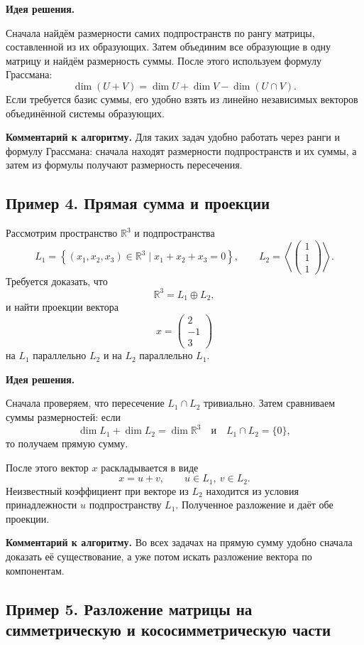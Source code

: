 \textbf{Идея решения.}

Сначала найдём размерности самих подпространств по рангу матрицы, составленной из их образующих. Затем объединим все образующие в одну матрицу и найдём размерность суммы. После этого используем формулу Грассмана:
\[
\dim(U+V)=\dim U+\dim V-\dim(U\cap V).
\]
Если требуется базис суммы, его удобно взять из линейно независимых векторов объединённой системы образующих.

\medskip
\noindent
\textbf{Комментарий к алгоритму.}
Для таких задач удобно работать через ранги и формулу Грассмана: сначала находят размерности подпространств и их суммы, а затем из формулы получают размерность пересечения.

\subsection*{Пример 4. Прямая сумма и проекции}

Рассмотрим пространство $\mathbb R^3$ и подпространства
\[
L_1=\left\{(x_1,x_2,x_3)\in\mathbb R^3 \mid x_1+x_2+x_3=0\right\},
\qquad
L_2=\left\langle
\begin{pmatrix}
1\\1\\1
\end{pmatrix}
\right\rangle.
\]
Требуется доказать, что
\[
\mathbb R^3=L_1\oplus L_2,
\]
и найти проекции вектора
\[
x=
\begin{pmatrix}
2\\-1\\3
\end{pmatrix}
\]
на $L_1$ параллельно $L_2$ и на $L_2$ параллельно $L_1$.

\textbf{Идея решения.}

Сначала проверяем, что пересечение $L_1\cap L_2$ тривиально. Затем сравниваем суммы размерностей: если
\[
\dim L_1+\dim L_2=\dim \mathbb R^3
\quad\text{и}\quad
L_1\cap L_2=\{0\},
\]
то получаем прямую сумму.

После этого вектор $x$ раскладывается в виде
\[
x=u+v,\qquad u\in L_1,\ v\in L_2.
\]
Неизвестный коэффициент при векторе из $L_2$ находится из условия принадлежности $u$ подпространству $L_1$. Полученное разложение и даёт обе проекции.

\medskip
\noindent
\textbf{Комментарий к алгоритму.}
Во всех задачах на прямую сумму удобно сначала доказать её существование, а уже потом искать разложение вектора по компонентам.

\subsection*{Пример 5. Разложение матрицы на симметрическую и кососимметрическую части}

